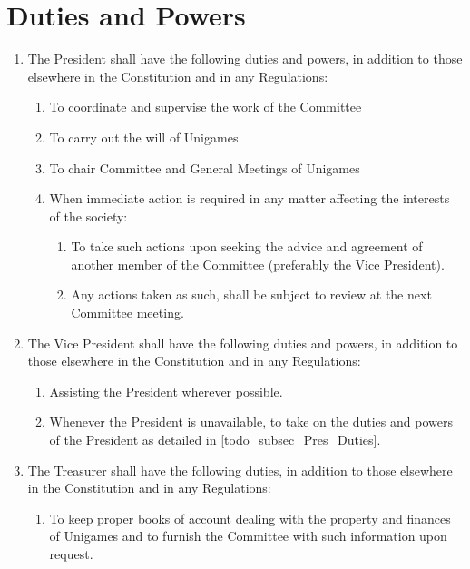 \documentclass[a4paper]{article}
\begin{document}
\section{Duties and Powers} \label{sec:duties}
\begin{enumerate}
    \item The President shall have the following duties and powers, in addition to those elsewhere in the Constitution and in any Regulations: \label{todo_subsec_Pres_Duties}
          \begin{enumerate}
              \item To coordinate and supervise the work of the Committee
              \item To carry out the will of Unigames
              \item To chair Committee and General Meetings of Unigames
              \item When immediate action is required in any matter affecting the interests of the society: \label{todo_enu_Power_Of_Exec}
                    \begin{enumerate}
                        \item To take such actions upon seeking the advice and agreement of another member of the Committee (preferably the Vice President).
                        \item Any actions taken as such, shall be subject to review at the next Committee meeting.
                    \end{enumerate}
          \end{enumerate}
    \item The Vice President shall have the following duties and powers, in addition to those elsewhere in the Constitution and in any Regulations:
          \begin{enumerate}
              \item Assisting the President wherever possible.
              \item Whenever the President is unavailable, to take on the duties and powers of the President as detailed in \cref{todo_subsec_Pres_Duties}.
          \end{enumerate}
    \item The Treasurer shall have the following duties, in addition to those elsewhere in the Constitution and in any Regulations:
          \begin{enumerate}
              \item To keep proper books of account dealing with the property and finances of Unigames and to furnish the Committee with such information upon request.

\end{enumerate}
\end{enumerate}
\end{document}
